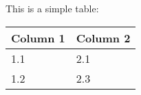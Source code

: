 \documentclass{book}
\begin{document}
This is a simple table:

\begin{table}
\begin{tabular}{| l | l |}
\hline
Column 1

 & Column 2

\\
\hline
1.1

 & 2.1

\\
\hline
1.2

 & 2.3

\\
\hline
\hline
\end{tabular}
\end{table}
\end{document}
